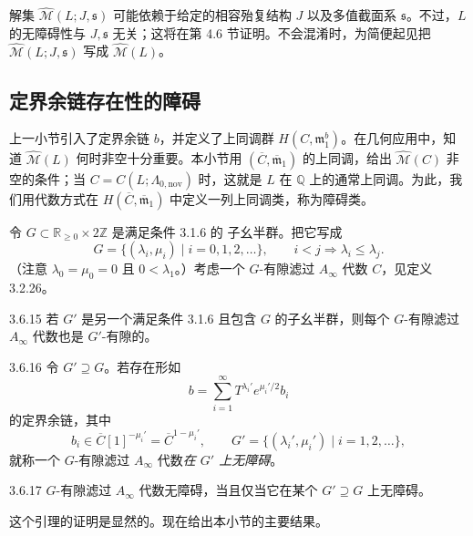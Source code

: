 解集 $\widehat{\mathcal M}(L;J,\mathfrak s)$ 可能依赖于给定的相容殆复结构
$J$ 以及多值截面系 $\mathfrak s$。不过，$L$ 的无障碍性与
$J,\mathfrak s$ 无关；这将在第 4.6 节证明。不会混淆时，为简便起见把
$\widehat{\mathcal M}(L;J,\mathfrak s)$ 写成
$\widehat{\mathcal M}(L)$。

\subsection{定界余链存在性的障碍}
\label{subsec:3-6-2}

上一小节引入了定界余链 $b$，并定义了上同调群
$H(C,\mathfrak m_1^b)$。在几何应用中，知道
$\widehat{\mathcal M}(L)$ 何时非空十分重要。本小节用
$(\overline C,\overline{\mathfrak m}_1)$ 的上同调，给出
$\widehat{\mathcal M}(C)$ 非空的条件；当
$C=C(L;\Lambda_{0,\mathrm{nov}})$ 时，这就是 $L$ 在
$\mathbb Q$ 上的通常上同调。为此，我们用代数方式在
$H(\overline C,\overline{\mathfrak m}_1)$ 中定义一列上同调类，称为障碍类。

令 $G\subset\mathbb R_{\geq0}\times2\mathbb Z$ 是满足条件 3.1.6 的
子幺半群。把它写成
\[
  G=\{(\lambda_i,\mu_i)\mid i=0,1,2,\ldots\},
  \qquad i<j\Longrightarrow\lambda_i\leq\lambda_j.
\]
（注意 $\lambda_0=\mu_0=0$ 且 $0<\lambda_1$。）考虑一个
$G$-有隙滤过 $A_\infty$ 代数 $C$，见定义 3.2.26。

\begin{remark}{3.6.15}\label{rem:3-6-15}
若 $G'$ 是另一个满足条件 3.1.6 且包含 $G$ 的子幺半群，则每个
$G$-有隙滤过 $A_\infty$ 代数也是 $G'$-有隙的。
\end{remark}

\begin{definition}{3.6.16}\label{def:3-6-16}
令 $G'\supseteq G$。若存在形如
\[
  b=\sum_{i=1}^{\infty}
  T^{\lambda_i'}e^{\mu_i'/2}b_i
\]
的定界余链，其中
\[
  b_i\in\overline C[1]^{-\mu_i'}
  =\overline C^{1-\mu_i'},
  \qquad
  G'=\{(\lambda_i',\mu_i')\mid i=1,2,\ldots\},
\]
就称一个 $G$-有隙滤过 $A_\infty$ 代数\emph{在 $G'$ 上无障碍}。
\end{definition}

\begin{lemma}{3.6.17}\label{lem:3-6-17}
$G$-有隙滤过 $A_\infty$ 代数无障碍，当且仅当它在某个
$G'\supseteq G$ 上无障碍。
\end{lemma}

这个引理的证明是显然的。现在给出本小节的主要结果。

